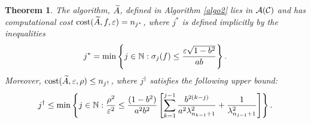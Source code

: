 \documentclass[final]{elsarticle}
\newtheorem{theorem}{Theorem}
\theoremstyle{definition}
\theoremstyle{remark}
\begin{document}
\begin{theorem}\label{thm:compcost}
The algorithm, $\widetilde{A}$, defined in Algorithm \ref{algo2} lies in $\mathcal{A}(\mathcal{C})$ and has computational cost $\operatorname{cost}(\widetilde{A},f,\varepsilon)=n_{j^*}$, where $j^*$ is defined implicitly by the inequalities 
\begin{equation} \label{eq:OurAlgjstar}
j^* = \min\left \{ j \in \mathbb{N} : \sigma_{j}(f) \le \frac{\varepsilon\sqrt{1 - b^2}}{ab}  \right\}.
\end{equation}
Moreover, $\operatorname{cost}(\widetilde{A},\varepsilon,\rho) \le n_{j^\dagger}$, where $j^\dagger$ satisfies the following upper bound:
\begin{equation} \label{jdagger}
j^\dagger \le \min \left \{j \in \mathbb{N} : \frac{\rho^2}{\varepsilon^2} \le \frac{(1 - b^2)}{a^2b^2} \left[ \sum_{k=1}^{j-1} \frac{b^{2(k-j)}}{a^2\lambda_{n_{k-1}+1}^2} + \frac{1}{\lambda_{n_{j-1}+1}^2}\right]   \right\}.
\end{equation}

\end{theorem}
\end{document}
